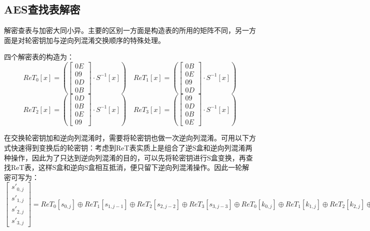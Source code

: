 \documentclass[11pt]{ctexart}
\begin{document}
\subsection{AES查找表解密} %
解密查表与加密大同小异。主要的区别一方面是构造表的所用的矩阵不同，另一方面是对轮密钥加与逆向列混淆交换顺序的特殊处理。

四个解密表的构造为：
\begin{equation*}
     ReT_0[x] = 
     \left(
    \begin{bmatrix}
    0E \\ 09 \\ 0D \\ 0B
    \end{bmatrix}
    \cdot S^{-1}[x] \right) \quad
    ReT_1[x] = 
     \left(
    \begin{bmatrix}
    0B \\ 0E \\ 09 \\ 0D
    \end{bmatrix}
    \cdot S^{-1}[x] \right)
\end{equation*}
\begin{equation*}
    ReT_2[x] = 
     \left(
    \begin{bmatrix}
    0D \\ 0B \\ 0E \\ 09
    \end{bmatrix}
    \cdot S^{-1}[x] \right) \quad
    ReT_3[x] = 
     \left(
    \begin{bmatrix}
    09 \\ 0D \\ 0B \\ 0E
    \end{bmatrix}
    \cdot S^{-1}[x] \right)
 \end{equation*} 

在交换轮密钥加和逆向列混淆时，需要将轮密钥也做一次逆向列混淆。可用以下方式快速得到变换后的轮密钥：考虑到ReT表实质上是组合了逆S盒和逆向列混淆两种操作，因此为了只达到逆向列混淆的目的，可以先将轮密钥进行S盒变换，再查找ReT表，这样S盒和逆向S盒相互抵消，便只留下逆向列混淆操作。因此一轮解密可写为：
\begin{equation*}
    \begin{bmatrix}
    s'_{0, j} \\ s'_{1, j} \\ s'_{2, j} \\ s'_{3, j}
    \end{bmatrix}
    =
    ReT_0[s_{0, j}] \oplus ReT_1[s_{1, j-1}] \oplus ReT_2[s_{2, j-2}] \oplus ReT_3[s_{3, j-3}] \oplus ReT_0[k_{0, j}] \oplus ReT_1[k_{1, j}] \oplus ReT_2[k_{2, j}] \oplus ReT_3[k_{3, j}]
 \end{equation*}
\end{document}

